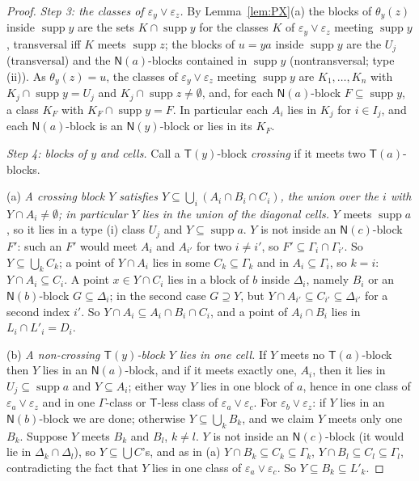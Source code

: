 \documentclass[11pt]{amsart}
\theoremstyle{definition}
\newcommand{\supp}{\operatorname{supp}}
\newcommand{\T}{\mathsf{T}}
\newcommand{\N}{\mathsf{N}}
\begin{document}
\begin{proof}
\smallskip\emph{Step 3: the classes of $\varepsilon_y\vee\varepsilon_z$.} By Lemma~\ref{lem:PX}(a) the blocks of $\theta_y(z)$ inside $\supp y$ are the sets $K\cap\supp y$ for the classes $K$ of $\varepsilon_y\vee\varepsilon_z$ meeting $\supp y$, transversal iff $K$ meets $\supp z$; the blocks of $u=ya$ inside $\supp y$ are the $U_j$ (transversal) and the $\N(a)$-blocks contained in $\supp y$ (nontransversal; type (ii)). As $\theta_y(z)=u$, the classes of $\varepsilon_y\vee\varepsilon_z$ meeting $\supp y$ are $K_1,\dots,K_n$ with $K_j\cap\supp y=U_j$ and $K_j\cap\supp z\ne\emptyset$, and, for each $\N(a)$-block $F\subseteq\supp y$, a class $K_F$ with $K_F\cap\supp y=F$. In particular each $A_i$ lies in $K_j$ for $i\in I_j$, and each $\N(a)$-block is an $\N(y)$-block or lies in its $K_F$.

\smallskip\emph{Step 4: blocks of $y$ and cells.} Call a $\T(y)$-block \emph{crossing} if it meets two $\T(a)$-blocks.

(a) \emph{A crossing block $Y$ satisfies $Y\subseteq\bigcup_i(A_i\cap B_i\cap C_i)$, the union over the $i$ with $Y\cap A_i\ne\emptyset$; in particular $Y$ lies in the union of the diagonal cells.} $Y$ meets $\supp a$, so it lies in a type (i) class $U_j$ and $Y\subseteq\supp a$. $Y$ is not inside an $\N(c)$-block $F'$: such an $F'$ would meet $A_i$ and $A_{i'}$ for two $i\ne i'$, so $F'\subseteq\Gamma_i\cap\Gamma_{i'}$. So $Y\subseteq\bigcup_kC_k$; a point of $Y\cap A_i$ lies in some $C_k\subseteq\Gamma_k$ and in $A_i\subseteq\Gamma_i$, so $k=i$: $Y\cap A_i\subseteq C_i$. A point $x\in Y\cap C_i$ lies in a block of $b$ inside $\Delta_i$, namely $B_i$ or an $\N(b)$-block $G\subseteq\Delta_i$; in the second case $G\supseteq Y$, but $Y\cap A_{i'}\subseteq C_{i'}\subseteq\Delta_{i'}$ for a second index $i'$. So $Y\cap A_i\subseteq A_i\cap B_i\cap C_i$, and a point of $A_i\cap B_i$ lies in $L_i\cap L'_i=D_i$.

(b) \emph{A non-crossing $\T(y)$-block $Y$ lies in one cell.} If $Y$ meets no $\T(a)$-block then $Y$ lies in an $\N(a)$-block, and if it meets exactly one, $A_i$, then it lies in $U_j\subseteq\supp a$ and $Y\subseteq A_i$; either way $Y$ lies in one block of $a$, hence in one class of $\varepsilon_a\vee\varepsilon_z$ and in one $\Gamma$-class or $\T$-less class of $\varepsilon_a\vee\varepsilon_c$. For $\varepsilon_b\vee\varepsilon_z$: if $Y$ lies in an $\N(b)$-block we are done; otherwise $Y\subseteq\bigcup_kB_k$, and we claim $Y$ meets only one $B_k$. Suppose $Y$ meets $B_k$ and $B_l$, $k\ne l$. $Y$ is not inside an $\N(c)$-block (it would lie in $\Delta_k\cap\Delta_l$), so $Y\subseteq\bigcup C$'s, and as in (a) $Y\cap B_k\subseteq C_k\subseteq\Gamma_k$, $Y\cap B_l\subseteq C_l\subseteq\Gamma_l$, contradicting the fact that $Y$ lies in one class of $\varepsilon_a\vee\varepsilon_c$. So $Y\subseteq B_k\subseteq L'_k$.


\end{proof}
\end{document}
